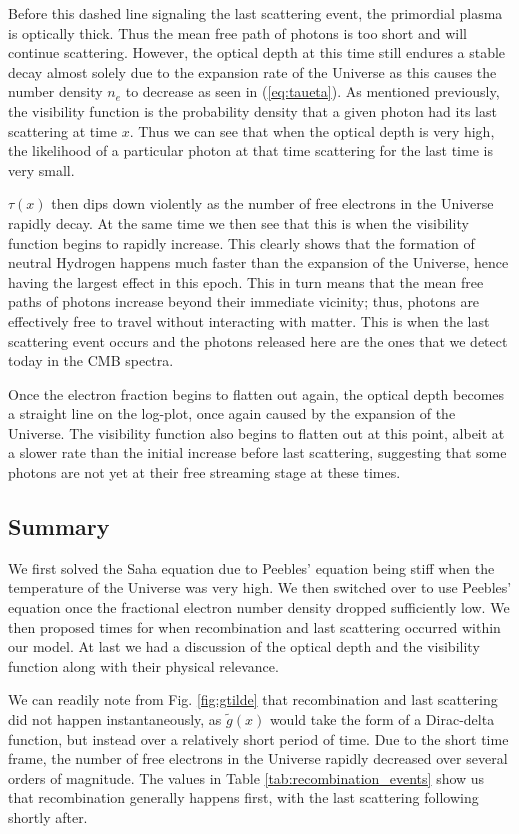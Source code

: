 \documentclass[%
reprint,
 amsmath,amssymb,
 aps,
]{revtex4-2}
\begin{document}
Before this dashed line signaling the last scattering event, the primordial plasma is optically thick. Thus the mean free path of photons is too short and will continue scattering. However, the optical depth at this time still endures a stable decay almost solely due to the expansion rate of the Universe as this causes the number density $n_e$ to decrease as seen in (\ref{eq:taueta}). As mentioned previously, the visibility function is the probability density that a given photon had its last scattering at time $x$. Thus we can see that when the optical depth is very high, the likelihood of a particular photon at that time scattering for the last time is very small. 

$\tau(x)$ then dips down violently as the number of free electrons in the Universe rapidly decay. At the same time we then see that this is when the visibility function begins to rapidly increase. This  clearly shows that the formation of neutral Hydrogen happens much faster than the expansion of the Universe, hence having the largest effect in this epoch. This in turn means that the mean free paths of photons increase beyond their immediate vicinity; thus, photons are effectively free to travel without interacting with matter. This is when the last scattering event occurs and the photons released here are the ones that we detect today in the CMB spectra. 

Once the electron fraction begins to flatten out again, the optical depth becomes a straight line on the log-plot, once again caused by the expansion of the Universe. The visibility function also begins to flatten out at this point, albeit at a slower rate than the initial increase before last scattering, suggesting that some photons are not yet at their free streaming stage at these times.


\subsection{Summary}
We first solved the Saha equation due to Peebles' equation being stiff when the temperature of the Universe was very high. We then switched over to use Peebles' equation once the fractional electron number density dropped sufficiently low. We then proposed times for when recombination and last scattering occurred within our model. At last we had a discussion of the optical depth and the visibility function along with their physical relevance.

We can readily note from Fig. \ref{fig:gtilde} that recombination and last scattering did not happen instantaneously, as $\tilde g(x)$ would take the form of a Dirac-delta function, but instead over a relatively short period of time. Due to the short time frame, the number of free electrons in the Universe rapidly decreased over several orders of magnitude. The values in Table \ref{tab:recombination_events} show us that recombination generally happens first, with the last scattering following shortly after.
\end{document}
